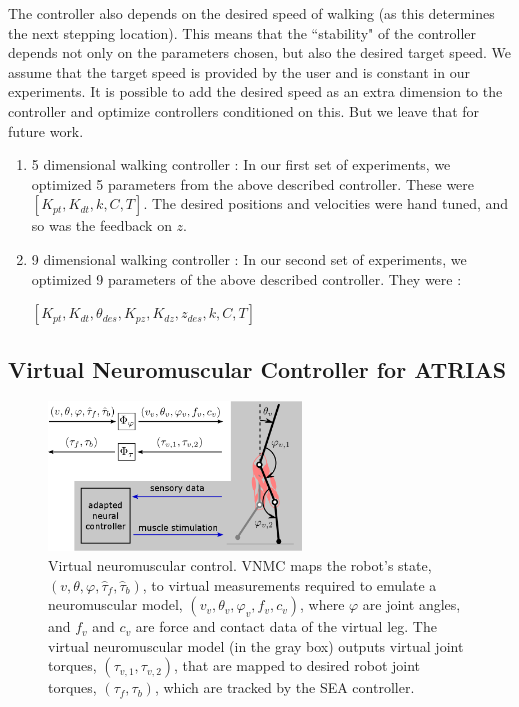 The controller also depends on the desired speed of walking (as this determines the next stepping location). This means that the ``stability" of the controller depends not only on the parameters chosen, but also the desired target speed. We assume that the target speed is provided by the user and is constant in our experiments. It is possible to add the desired speed as an extra dimension to the controller and optimize controllers conditioned on this. But we leave that for future work.

\begin{enumerate}
    \item 5 dimensional walking controller : In our first set of experiments, we optimized 5 parameters from the above described controller. These were $[K_{pt}, K_{dt}, k, C, T]$. The desired positions and velocities were hand tuned, and so was the feedback on $z$.
    \item 9 dimensional walking controller : In our second set of experiments, we optimized 9 parameters of the above described controller. They were :
    
    $[K_{pt}, K_{dt}, \theta_{des}, K_{pz}, K_{dz}, z_{des}, k, C, T]$
\end{enumerate}

\subsection{Virtual Neuromuscular Controller for ATRIAS}
\label{sec:VNMC_cont}

\begin{figure}[t]
\centering
\includegraphics[width=0.6\textwidth]{img/VNMC.png}
\caption{\small{Virtual neuromuscular control.
VNMC maps the robot's state, $(v, \theta, \varphi, \hat{\tau}_f, \hat{\tau}_b)$, to virtual measurements required to emulate a neuromuscular model, $(v_v, \theta_v,  \varphi_v, f_v, c_v)$, where $\varphi$ are joint angles, and $f_v$ and $c_v$ are force and contact data of the virtual leg.
The virtual neuromuscular model (in the gray box) outputs virtual joint torques, $(\tau_{v,1}, \tau_{v,2})$, that are mapped to desired robot joint torques, $(\tau_f, \tau_b)$, which are tracked by the SEA controller.}}
\label{fig:VNMC}
\end{figure}

